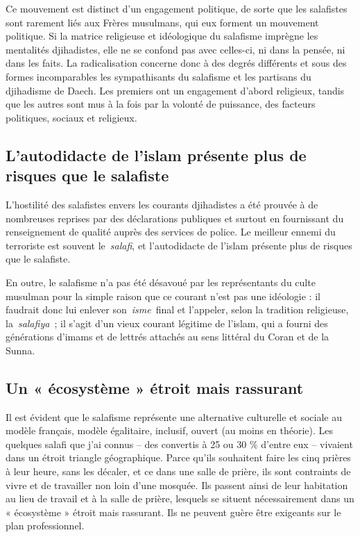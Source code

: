 Ce mouvement est distinct d'un engagement politique, de sorte que les
salafistes sont rarement liés aux Frères musulmans, qui eux forment un
mouvement politique. Si la matrice religieuse et idéologique du
salafisme imprègne les mentalités djihadistes, elle ne se confond pas
avec celles-ci, ni dans la pensée, ni dans les faits. La radicalisation
concerne donc à des degrés différents et sous des formes incomparables
les sympathisants du salafisme et les partisans du djihadisme de Daech.
Les premiers ont un engagement d'abord religieux, tandis que les autres
sont mus à la fois par la volonté de puissance, des facteurs politiques,
sociaux et religieux.

\subsection{L'autodidacte de l'islam présente plus de risques que le
salafiste}

L'hostilité des salafistes envers les courants djihadistes a été prouvée
à de nombreuses reprises par des déclarations publiques et surtout en
fournissant du renseignement de qualité auprès des services de police.
Le meilleur ennemi du terroriste est souvent le~\emph{salafi}, et
l'autodidacte de l'islam présente plus de risques que le salafiste.

En outre, le salafisme n'a pas été désavoué par les représentants du
culte musulman pour la simple raison que ce courant n'est pas une
idéologie : il faudrait donc lui enlever son~\emph{isme}~final et
l'appeler, selon la tradition religieuse, la~\emph{salafiya~}; il s'agit
d'un vieux courant légitime de l'islam, qui a fourni des générations
d'imams et de lettrés attachés au sens littéral du Coran et de la Sunna.

\subsection{Un « écosystème » étroit mais rassurant}

Il est évident que le salafisme représente une alternative culturelle et
sociale au modèle français, modèle égalitaire, inclusif, ouvert (au
moins en théorie). Les quelques salafi que j'ai connus -- des convertis
à 25 ou 30 \% d'entre eux -- vivaient dans un étroit triangle
géographique. Parce qu'ils souhaitent faire les cinq prières à leur
heure, sans les décaler, et ce dans une salle de prière, ils sont
contraints de vivre et de travailler non loin d'une mosquée. Ils passent
ainsi de leur habitation au lieu de travail et à la salle de prière,
lesquels se situent nécessairement dans un « écosystème » étroit mais
rassurant. Ils ne peuvent guère être exigeants sur le plan
professionnel.

